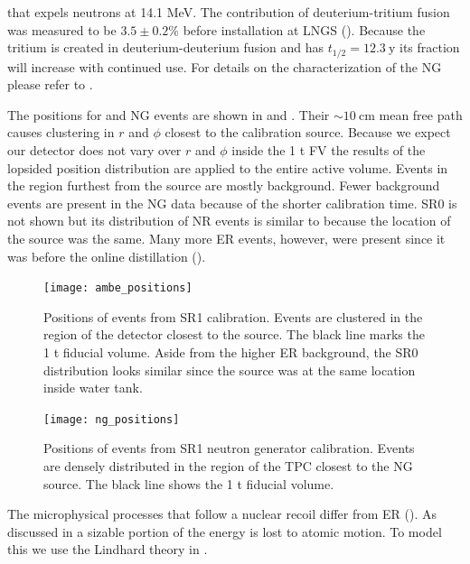 \noindent that expels neutrons at 14.1 MeV.  The contribution of deuterium-tritium fusion was measured to be $3.5 \pm 0.2\%$ before
installation at LNGS ().  Because the tritium is created in deuterium-deuterium fusion and has
$t_{1/2} = 12.3\ \mathrm{y}$ its fraction will increase with continued use.  For details on the characterization of the NG
please refer to .

The positions for \ambe and NG events are shown in  and
.  Their ${\sim}10\ \mathrm{cm}$ mean free path causes clustering
in $r$ and $\phi$ closest to the calibration source.  Because we expect our
detector does not vary over $r$ and $\phi$ inside the 1 t FV the results of the lopsided position distribution are applied to the entire
active volume.  Events in the region furthest from the source are mostly background.  Fewer background events are present in the NG data
because of the shorter calibration time.  SR0 \ambe is not shown but its distribution of NR events is similar to
 because the location of the source was the same.  Many more ER events,
however, were present since it was before the online distillation ().

\begin{figure}
\centering
\texttt{[image: ambe\_positions]}
\caption{Positions of events from SR1 \ambe calibration.  Events are clustered in the region of the detector closest to the \ambe
source.  The black line marks the 1 t fiducial volume.  Aside from the higher ER background, the SR0 distribution looks similar since the
source was at the same location inside water tank.}
\label{fig:er_nr_calibrations_parameter_determ_nr_ambe_positions}
\end{figure}

\begin{figure}
\centering
\texttt{[image: ng\_positions]}
\caption{Positions of events from SR1 neutron generator calibration.  Events are densely distributed in the region of the TPC closest to
the NG source.  The black line shows the 1 t fiducial volume.}
\label{fig:er_nr_calibrations_parameter_determ_nr_ng_positions}
\end{figure}

The microphysical processes that follow a nuclear recoil differ from ER ().  As
discussed in  a sizable portion of the energy is lost to atomic motion.  To model this we use the Lindhard theory
in .

